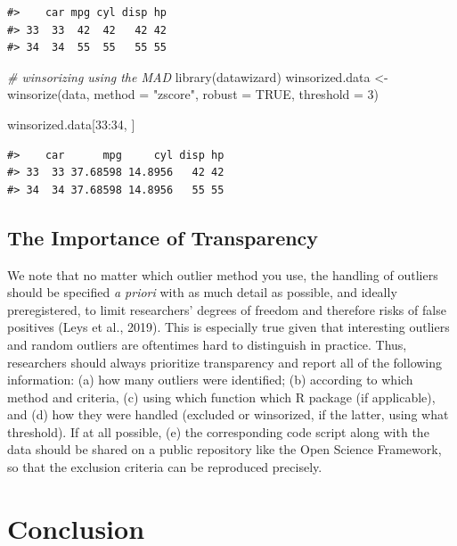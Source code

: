 \documentclass[
]{article}
\newenvironment{Shaded}{\begin{snugshade}}{\end{snugshade}}
\newcommand{\AttributeTok}[1]{\textcolor[rgb]{0.77,0.63,0.00}{#1}}
\newcommand{\CommentTok}[1]{\textcolor[rgb]{0.56,0.35,0.01}{\textit{#1}}}
\newcommand{\ConstantTok}[1]{\textcolor[rgb]{0.00,0.00,0.00}{#1}}
\newcommand{\DecValTok}[1]{\textcolor[rgb]{0.00,0.00,0.81}{#1}}
\newcommand{\FunctionTok}[1]{\textcolor[rgb]{0.00,0.00,0.00}{#1}}
\newcommand{\NormalTok}[1]{#1}
\newcommand{\OtherTok}[1]{\textcolor[rgb]{0.56,0.35,0.01}{#1}}
\newcommand{\SpecialCharTok}[1]{\textcolor[rgb]{0.00,0.00,0.00}{#1}}
\newcommand{\StringTok}[1]{\textcolor[rgb]{0.31,0.60,0.02}{#1}}
\begin{document}
\begin{verbatim}
#>    car mpg cyl disp hp
#> 33  33  42  42   42 42
#> 34  34  55  55   55 55
\end{verbatim}

\begin{Shaded}
\begin{Highlighting}[]
\CommentTok{\# winsorizing using the MAD}
\FunctionTok{library}\NormalTok{(datawizard)}
\NormalTok{winsorized.data }\OtherTok{\textless{}{-}} \FunctionTok{winsorize}\NormalTok{(data, }\AttributeTok{method =} \StringTok{"zscore"}\NormalTok{, }\AttributeTok{robust =} \ConstantTok{TRUE}\NormalTok{, }\AttributeTok{threshold =} \DecValTok{3}\NormalTok{)}

\NormalTok{winsorized.data[}\DecValTok{33}\SpecialCharTok{:}\DecValTok{34}\NormalTok{, ]}
\end{Highlighting}
\end{Shaded}

\begin{verbatim}
#>    car      mpg     cyl disp hp
#> 33  33 37.68598 14.8956   42 42
#> 34  34 37.68598 14.8956   55 55
\end{verbatim}

\hypertarget{the-importance-of-transparency}{%
\subsection{The Importance of Transparency}\label{the-importance-of-transparency}}

We note that no matter which outlier method you use, the handling of outliers should be specified \emph{a priori} with as much detail as possible, and ideally preregistered, to limit researchers' degrees of freedom and therefore risks of false positives (Leys et al., 2019). This is especially true given that interesting outliers and random outliers are oftentimes hard to distinguish in practice. Thus, researchers should always prioritize transparency and report all of the following information: (a) how many outliers were identified; (b) according to which method and criteria, (c) using which function which R package (if applicable), and (d) how they were handled (excluded or winsorized, if the latter, using what threshold). If at all possible, (e) the corresponding code script along with the data should be shared on a public repository like the Open Science Framework, so that the exclusion criteria can be reproduced precisely.

\hypertarget{conclusion}{%
\section{Conclusion}\label{conclusion}}
\end{document}
